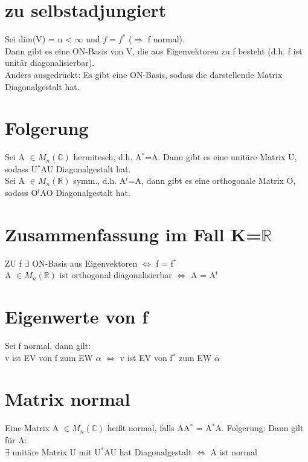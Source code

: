 \documentclass[fontsize=10pt]{scrartcl}
\begin{document}
\section{zu selbstadjungiert}
Sei dim(V) = n < $\infty$ und $f = f^*$ ($\Rightarrow$ f normal).\\
Dann gibt es eine ON-Basis von V, die aus Eigenvektoren zu f besteht (d.h. f ist unitär diagonalisierbar).\\
Anders ausgedrückt: Es gibt eine ON-Basis, sodass die darstellende Matrix Diagonalgestalt hat.

\section{Folgerung}
Sei A $\in M_n(\mathbb{C})$ hermitesch, d.h. A$^*$=A. Dann gibt es eine unitäre Matrix U, sodass U$^*$AU Diagonalgestalt hat.\\
Sei A $\in M_n(\mathbb{R})$ symm., d.h. A$^t$=A, dann gibt es eine orthogonale Matrix O, sodass O$^t$AO Diagonalgestalt hat.\\

\section{Zusammenfassung im Fall K=$\mathbb{R}$}
ZU f $\exists$ ON-Basis aus Eigenvektoren $\Leftrightarrow$ f = f$^*$\\
A $\in M_n(\mathbb{R})$ ist orthogonal diagonalisierbar $\Leftrightarrow$ A = A$^t$\\

\section{Eigenwerte von f}
Sei f normal, dann gilt:\\
v ist EV von f  zum EW $\alpha$ $\Leftrightarrow$ v ist EV von f$^*$ zum EW $\overline{\alpha}$

\section{Matrix normal}
Eine Matrix A $\in M_n(\mathbb{C})$ heißt normal, falls AA$^*$ = A$^*$A. Folgerung: Dann gilt für A:\\
$\exists$ unitäre Matrix U mit U$^*$AU hat Diagonalgestalt $\Leftrightarrow$ A ist normal
\end{document}
